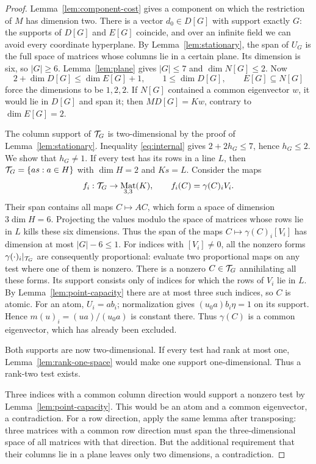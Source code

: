 \documentclass[11pt,a4paper]{article}
\numberwithin{equation}{section}
\theoremstyle{plain}
\theoremstyle{definition}
\DeclareMathOperator{\Mat}{Mat}\DeclareMathOperator{\Span}{span}
\newcommand{\leqs}{\leqslant}\newcommand{\geqs}{\geqslant}
\begin{document}
\begin{proof}
Lemma~\ref{lem:component-cost} gives a component on which the restriction
of $M$ has dimension two. There is a vector $d_0\in D[G]$ with support
exactly $G$: the supports of $D[G]$ and $E[G]$ coincide, and over an
infinite field we can avoid every coordinate hyperplane.
By Lemma~\ref{lem:stationary}, the span of $U_G$ is the full space of
matrices whose columns lie in a certain plane. Its dimension is six,
so $|G|\geqs6$. Lemma~\ref{lem:plane} gives $|G|\leqs7$ and
$\dim N[G]\leqs2$. Now
\[
 2+\dim D[G]\leqs\dim E[G]+1,\qquad
 1\leqs\dim D[G],\qquad E[G]\subseteq N[G]
\]
force the dimensions to be $1,2,2$. If $N[G]$ contained a common
eigenvector $w$, it would lie in $D[G]$ and span it; then
$MD[G]=Kw$, contrary to $\dim E[G]=2$.

The column support of $\mathcal T_G$ is two-dimensional by the proof of
Lemma~\ref{lem:stationary}. Inequality \eqref{eq:internal} gives
$2+2h_G\leqs7$, hence $h_G\leqs2$.
We show that $h_G\ne1$. If every test has its rows in a line $L$,
then $\mathcal T_G=\{as:a\in H\}$ with $\dim H=2$ and $Ks=L$.
Consider the maps
\[
 f_i:\test_G\to\Mat_{3,3}(K),\qquad f_i(C)=\gamma(C)_iV_i.
\]
Their span contains all maps $C\mapsto AC$, which form a space of
dimension $3\dim H=6$. Projecting the values modulo the space of
matrices whose rows lie in $L$ kills these six dimensions.
Thus the span of the maps $C\mapsto\gamma(C)_i[V_i]$ has dimension
at most $|G|-6\leqs1$.
For indices with $[V_i]\ne0$, all the nonzero forms
$\gamma(\cdot)_i|_{\mathcal T_G}$ are consequently proportional: evaluate
two proportional maps on any test where one of them is nonzero.
There is a nonzero $C\in\mathcal T_G$ annihilating all these forms.
Its support consists only of indices for which the rows of $V_i$
lie in $L$. By Lemma~\ref{lem:point-capacity} there are at most three
such indices, so $C$ is atomic.
For an atom, $U_i=ab_i$; normalization gives $(u_0a)b_i\eta=1$ on
its support. Hence $m(u)_i=(ua)/(u_0a)$ is constant there.
Thus $\gamma(C)$ is a common eigenvector, which has already been excluded.

Both supports are now two-dimensional. If every test had rank at
most one, Lemma~\ref{lem:rank-one-space} would make one support
one-dimensional. Thus a rank-two test exists.

Three indices with a common column direction would support a nonzero
test by Lemma~\ref{lem:point-capacity}. This would be an atom and a
common eigenvector, a contradiction. For a row direction, apply the
same lemma after transposing: three matrices with a common row
direction must span the three-dimensional space of all matrices
with that direction. But the additional requirement that their
columns lie in a plane leaves only two dimensions, a contradiction.
\end{proof}
\end{document}
